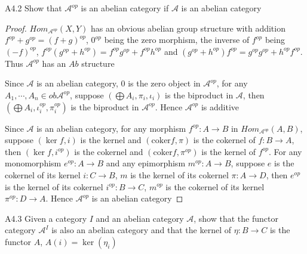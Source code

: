 \documentclass[../main.tex]{subfiles}
\begin{document}
\begin{customexercise}{A4.2}
Show that $\mathcal A^{op}$ is an abelian category if $\mathcal A$ is an abelian category
\end{customexercise}

\begin{proof}
$Hom_{\mathcal A^{op}}(X,Y)$ has an obvious abelian group structure with addition $f^{op}+g^{op}=(f+g)^{op}$, $0^{op}$ being the zero morphism, the inverse of $f^{op}$ being $(-f)^{op}$, $f^{op}(g^{op}+h^{op})=f^{op}g^{op}+f^{op}h^{op}$ and $
(g^{op}+h^{op})f^{op}=g^{op}g^{op}+h^{op}f^{op}$. Thus $\mathcal A^{op}$ has an $Ab$ structure \par
Since $\mathcal A$ is an abelian category, $0$ is the zero object in $\mathcal A^{op}$, for any $A_1,\cdots,A_n\in ob\mathcal A^{op}$, suppose $(\bigoplus A_i,\pi_i,\iota_i)$ is the biproduct in $\mathcal A$, then $(\bigoplus A_i,\iota_i^{op},\pi_i^{op})$ is the biproduct in $\mathcal A^{op}$. Hence $\mathcal A^{op}$ is additive \par
Since $\mathcal A$ is an abelian category, for any morphism $f^{op}:A\to B$ in $Hom_{\mathcal A^{op}}(A,B)$, suppose $(\ker f,i)$ is the kernel and $(\mathrm{coker}f,\pi)$ is the cokernel of $f:B\to A$, then $(\ker f,i^{op})$ is the cokernel and $(\mathrm{coker}f,\pi^{op})$ is the kernel of $f^{op}$. For any monomorphism $e^{op}:A\to B$ and any epimorphism $m^{op}:A\to B$, suppose $e$ is the cokernel of its kernel $i:C\to B$, $m$ is the kernel of its cokernel $\pi:A\to D$, then $e^{op}$ is the kernel of its cokernel $i^{op}:B\to C$, $m^{op}$ is the cokernel of its kernel $\pi^{op}:D\to A$. Hence $\mathcal A^{op}$ is an abelian category
\end{proof}

\begin{customexercise}{A4.3}
Given a category $I$ and an abelian category $\mathcal A$, show that the functor category $\mathcal A^I$ is also an abelian category and that the kernel of $\eta:B\to C$ is the functor $A$, $A(i)=\ker(\eta_i)$
\end{customexercise}
\end{document}
